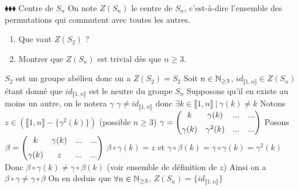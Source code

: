 \documentclass[11pt]{article}
\begin{document}
\begin{exercise}{$\blacklozenge\blacklozenge\blacklozenge$}{}
    Centre de $S_{n}$\n
    On note $Z(S_{n})$ le centre de $S_{n}$, c'est-à-dire l'ensemble des permutations qui commutent avec toutes les autres.\n
    \begin{enumerate}
        \item Que vaut $Z(S_{2})$ ?
        \item Montrer que $Z(S_{n})$ est trivial dès que $n \geq 3$.
    \end{enumerate}
    \tcblower\n[0.2cm]
     $S_{2}$ est un groupe abélien donc on a $Z(S_{2}) = S_{2}$\n\n
     Soit $n \in \mathbb{N}_{\geq 3}$, $id_{\llbracket 1, n \rrbracket} \in Z(S_{n})$ étant donné que $id_{\llbracket 1, n \rrbracket}$ est le neutre du groupe $S_{n}$\n\n
    Supposons qu'il en existe au moins un autre, on le notera $\gamma$\n
    $\gamma \neq id_{\llbracket 1, n \rrbracket}$ donc $\exists k \in \llbracket 1, n \rrbracket ~|~ \gamma(k) \neq k$\n
    Notons $z \in (\llbracket 1, n \rrbracket - \{\gamma^{2}(k)\})$ (possible $n \geq 3$) \n\n
    $\gamma = \begin{pmatrix}
        k & \gamma(k) & ... & ... \n
        \gamma(k) & \gamma^{2}(k) & ... & ...
    \end{pmatrix}$\n\n
    Posons $\beta = \begin{pmatrix}
        k & \gamma(k) & ... & ... \n
        \gamma(k) & z & ... & ...
    \end{pmatrix}$\n\n
    $\beta \circ \gamma(k) = z$ et $\gamma \circ \beta(k) = \gamma \circ \gamma(k) = \gamma^{2}(k)$\n
    Donc $\beta \circ \gamma(k) \neq \gamma \circ \beta(k)$ (voir ensemble de définition de $z$)\n\n
    Ainsi on a $\beta \circ \gamma \neq \gamma \circ \beta$\n\n
    On en deduis que $\forall n \in \mathbb{N}_{\geq 3}$, $Z(S_{n}) = \{ id_{\llbracket 1, n \rrbracket} \}$
\end{exercise}
\end{document}
